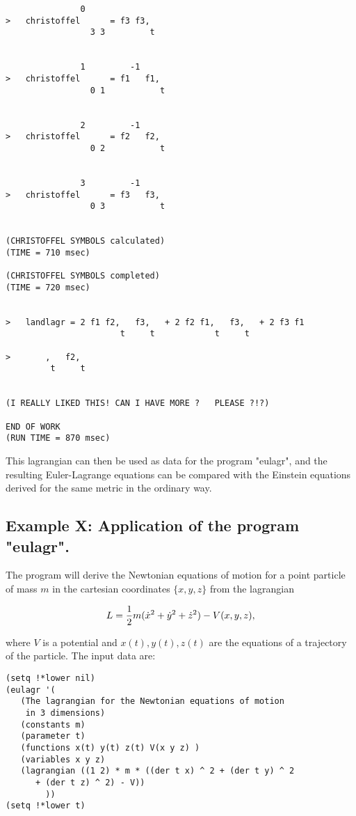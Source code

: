 \begin{verbatim}
               0
>   christoffel      = f3 f3,
                 3 3         t


               1         -1
>   christoffel      = f1   f1,
                 0 1           t


               2         -1
>   christoffel      = f2   f2,
                 0 2           t


               3         -1
>   christoffel      = f3   f3,
                 0 3           t


(CHRISTOFFEL SYMBOLS calculated)
(TIME = 710 msec)

(CHRISTOFFEL SYMBOLS completed)
(TIME = 720 msec)


>   landlagr = 2 f1 f2,   f3,   + 2 f2 f1,   f3,   + 2 f3 f1
                       t     t            t     t

>       ,   f2,
         t     t


(I REALLY LIKED THIS! CAN I HAVE MORE ?   PLEASE ?!?)

END OF WORK
(RUN TIME = 870 msec)
\end{verbatim}

This lagrangian can then be used as data for the program "eulagr", and the
resulting Euler-Lagrange equations can be compared with the Einstein equations
derived for the same metric in the ordinary way.

\bigskip

\subsection{Example X: Application of the program "eulagr".}

The program will derive the Newtonian equations of motion for a point particle
of mass $m$ in the cartesian coordinates $\{x, y, z\}$ from the lagrangian

$$ L = {1 \over 2} m ({\dot {x}}^2 + {\dot {y}}^2 + {\dot {z}}^2) - V(x, y, z),
$$

\noindent where $V$ is a potential and $x(t), y(t), z(t)$ are the equations of
a trajectory of the particle. The input data are:

\bigskip

\begin{verbatim}
(setq !*lower nil)
(eulagr '(
   (The lagrangian for the Newtonian equations of motion
    in 3 dimensions)
   (constants m)
   (parameter t)
   (functions x(t) y(t) z(t) V(x y z) )
   (variables x y z)
   (lagrangian ((1 2) * m * ((der t x) ^ 2 + (der t y) ^ 2
      + (der t z) ^ 2) - V))
        ))
(setq !*lower t)
\end{verbatim}

